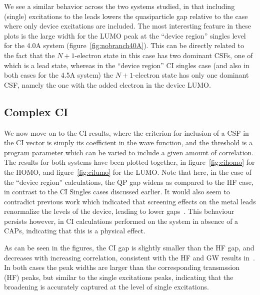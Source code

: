 We see a similar behavior across the two systems studied, in that including
(single) excitations to the leads lowers the quasiparticle gap relative to the
case where only device excitations are included. The most interesting feature
in these plots is the large width for the \ac{LUMO} peak at the
``device region'' singles level for the 4.0A system
(figure~\ref{fig:nobranch40A}). This can be directly related to the fact that
the $N+1$-electron state in this case has two dominant \acp{CSF}, one of which
is a lead state, whereas in the ``device region'' CI singles case (and also in
both cases for the 4.5A system) the $N+1$-electron state has only one dominant
\ac{CSF}, namely the one with the added electron in the device \ac{LUMO}.

\subsection{Complex \ac{CI}}

We now move on to the \ac{CI} results, where the criterion for inclusion of a
\ac{CSF} in the \ac{CI} vector is simply its coefficient in the wave function,
and the threshold is a program parameter which can be varied to include a given
amount of correlation. The results for both systems have been plotted together,
in figure~\ref{fig:cihomo} for the \ac{HOMO}, and figure~\ref{fig:cilumo}
for the \ac{LUMO}. Note that here, in the case of the ``device region''
calculations, the QP gap widens as compared to the HF case, in contrast to the
CI Singles cases discussed earlier. It would also seem to contradict previous
work which indicated that screening effects on the metal leads renormalize the
levels of the device, leading to lower gaps~\cite{thygesen_rubio, thygesen}.
This behaviour persists however, in \ac{CI} calculations performed on the
system in absence of a \acp{CAP}, indicating that this is a physical effect.

As can be seen in the figures, the \ac{CI} gap is slightly smaller than the HF
gap, and decreases with increasing correlation, consistent with the HF and GW
results in~\cite{thygesen_rubio, thygesenrubio2010corr}. In both cases the peak
widths are larger than the corresponding transmssion (HF) peaks, but similar
to the single excitations peaks, indicating that the broadening is accurately
captured at the level of single excitations.


